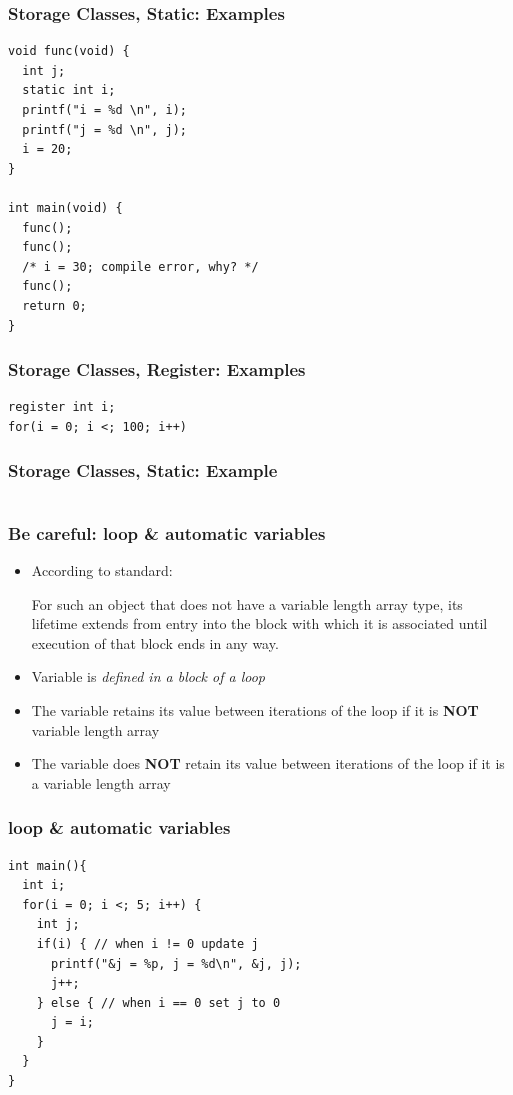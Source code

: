 \documentclass{../c-lecture}
\begin{document}
\begin{frame}[fragile]
  \frametitle{Storage Classes, Static: Examples}
  \scriptsize
  \begin{verbatim}
void func(void) {
  int j;
  static int i;
  printf("i = %d \n", i);
  printf("j = %d \n", j);
  i = 20;
}

int main(void) {
  func();
  func();
  /* i = 30; compile error, why? */
  func();
  return 0;
}
  \end{verbatim}
\end{frame}

\begin{frame}[fragile]
  \frametitle{Storage Classes, Register: Examples}
  \scriptsize
  \begin{verbatim}
register int i;
for(i = 0; i <; 100; i++)
  \end{verbatim}
\end{frame}

\begin{frame}[fragile]
  \frametitle{Storage Classes, Static: Example}
  \scriptsize
  \inputminted[bgcolor=Black]{c}{./src/static.c}
\end{frame}

\begin{frame}
  \frametitle{Be careful: loop \& automatic variables}
  \begin{itemize}
    \item According to standard:
    \begin{block}{}
      For such an object that does not have a variable length array type, its
      lifetime extends from entry into the block with which it is associated
      until execution of that block ends in any way.
    \end{block}
    \item Variable is \textit{\color{Yellow} defined in a block of a loop}
    \item
      The variable retains its value between iterations of the loop if it is
      \textbf{\color{RubineRed} NOT} variable length array
    \item
      The variable does \textbf{\color{RubineRed} NOT} retain its value between
      iterations of the loop if it is a variable length array
  \end{itemize}
\end{frame}

\begin{frame}[fragile]
  \frametitle{loop \& automatic variables}
  \begin{verbatim}
int main(){
  int i;
  for(i = 0; i <; 5; i++) {
    int j;
    if(i) { // when i != 0 update j
      printf("&j = %p, j = %d\n", &j, j);
      j++;
    } else { // when i == 0 set j to 0
      j = i;
    }
  }
}
  \end{verbatim}
\end{frame}
\end{document}
